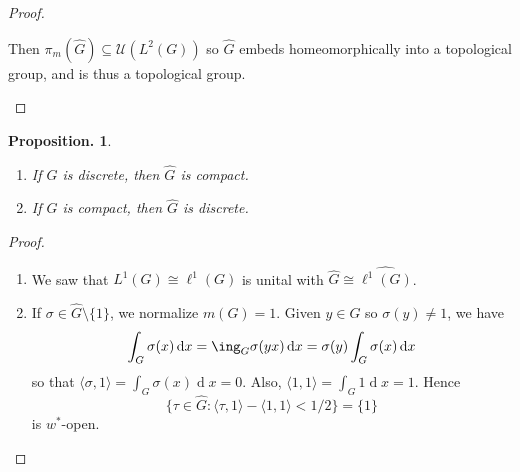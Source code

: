 \documentclass[11pt, a4paper]{memoir}
\theoremstyle{change}
\newtheorem{proposition}[theorem]{Proposition.}
\theoremstyle{plain}
\theoremstyle{nonumberplain}
\newtheorem{proof}{Proof}
\renewcommand{\d}[1]{\ensuremath{\operatorname{d}\!{#1}}}
\numberwithin{equation}{section}
\begin{document}
\begin{proof}
\begin{enumerate}[nl,r]
            Then $\pi_m(\widehat{G})\subseteq\mathcal{U}(L^2(G))$ so $\widehat{G}$ embeds homeomorphically into a topological group, and is thus a topological group.
    \end{enumerate}
\end{proof}
\begin{proposition}
    \begin{enumerate}[nl,r]
        \item If $G$ is discrete, then $\widehat{G}$ is compact.
        \item If $G$ is compact, then $\widehat{G}$ is discrete.
    \end{enumerate}
\end{proposition}
\begin{proof}
    \begin{enumerate}[nl,r]
        \item We saw that $L^1(G)\cong \ell^1(G)$ is unital with $\widehat{G}\cong\widehat{\ell^1(G)}$.
        \item If $\sigma\in\widehat{G}\setminus\{1\}$, we normalize $m(G)=1$.
            Given $y\in G$ so $\sigma(y)\neq 1$, we have
            \begin{equation*}
                \int_G\sigma(x)\d{x}=\ing_G\sigma(yx)\d{x}=\sigma(y)\int_G\sigma(x)\d{x}
            \end{equation*}
            so that $\langle\sigma,1\rangle=\int_G\sigma(x)\d{x}=0$.
            Also, $\langle 1,1\rangle=\int_G 1\d{x}=1$.
            Hence
            \begin{equation*}
                \{\tau\in\widehat{G}:\langle\tau,1\rangle-\langle 1,1\rangle<1/2\}=\{1\}
            \end{equation*}
            is $w^*$-open.
    \end{enumerate}
\end{proof}
\end{document}
